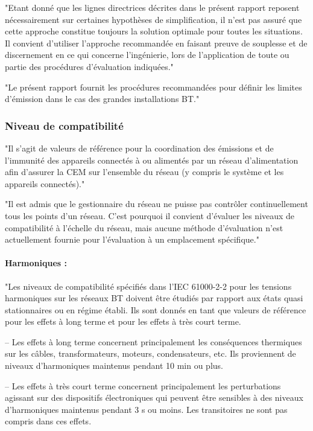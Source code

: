 "Etant donné que les lignes directrices décrites dans le présent rapport reposent nécessairement sur certaines hypothèses de simplification, il n'est pas assuré que cette approche constitue toujours la solution optimale pour toutes les situations. Il convient d'utiliser l'approche recommandée en faisant preuve de souplesse et de discernement en ce qui concerne l'ingénierie, lors de l'application de toute ou partie des procédures d'évaluation indiquées."


"Le présent rapport fournit les procédures recommandées pour définir les limites d'émission dans le cas des grandes installations BT."



\subsubsection{Niveau de compatibilité}

"Il s'agit de valeurs de référence pour la coordination des émissions et de l'immunité des appareils connectés à ou alimentés par un réseau d'alimentation afin d'assurer la CEM sur l'ensemble du réseau (y compris le système et les appareils connectés)."

"Il est admis que le gestionnaire du réseau ne puisse pas contrôler continuellement tous les points d'un réseau. C'est pourquoi il convient d'évaluer les niveaux de compatibilité à l'échelle du réseau, mais aucune méthode d'évaluation n'est actuellement fournie pour l'évaluation à un emplacement spécifique."

\paragraph{Harmoniques :}

"Les niveaux de compatibilité spécifiés dans l'IEC 61000-2-2 pour les tensions harmoniques sur les réseaux BT doivent être étudiés par rapport aux états quasi stationnaires ou en régime établi. Ils sont donnés en tant que valeurs de référence pour les effets à long terme et pour les effets à très court terme.

– Les effets à long terme concernent principalement les conséquences thermiques sur les câbles, transformateurs, moteurs, condensateurs, etc. Ils proviennent de niveaux d'harmoniques maintenus pendant 10 min ou plus.

– Les effets à très court terme concernent principalement les perturbations agissant sur des dispositifs électroniques qui peuvent être sensibles à des niveaux d'harmoniques maintenus pendant 3 s ou moins. Les transitoires ne sont pas compris dans ces effets.

